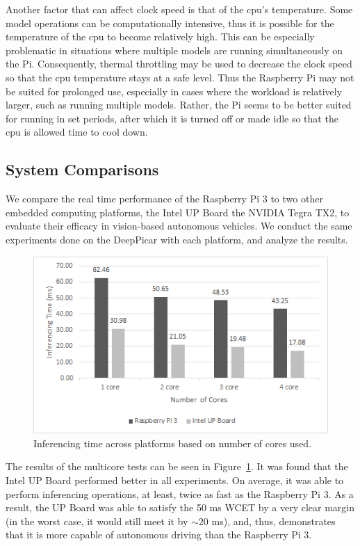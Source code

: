 Another factor that can affect clock speed is that of the cpu's temperature. Some model operations can 
be computationally intensive, thus it is possible for the temperature of the cpu to become relatively 
high. This can be especially problematic in situations where multiple models are running 
simultaneously on the Pi. Consequently, thermal throttling may be used to decrease the clock 
speed so that the cpu temperature stays at a safe level. Thus the Raspberry Pi may not be suited 
for prolonged use, especially in cases where the workload is relatively larger, such as running multiple 
models. Rather, the Pi seems to be better suited for running in set periods, after which it is turned 
off or made idle so that the cpu is allowed time to cool down.

\subsection{System Comparisons}
We compare the real time performance of the Raspberry Pi 3 to two other embedded computing platforms, 
the Intel UP Board the NVIDIA Tegra TX2, to evaluate their efficacy in vision-based autonomous 
vehicles. We conduct the same experiments done on the DeepPicar with each platform, and analyze the 
results.

\begin{figure}[h]
  \centering
  \includegraphics[width=.5\textwidth]{figs/system_multicore}
  \caption{Inferencing time across platforms based on number of cores used.}
  \label{fig:sys_core}
\end{figure}

The results of the multicore tests can be seen in Figure~\ref{fig:sys_core}. It was found that the 
Intel UP Board performed better in all experiments. On average, it was able to perform inferencing 
operations, at least, twice as fast as the Raspberry Pi 3. As a result, the UP Board was able to 
satisfy the 50 ms WCET by a very clear margin (in the worst case, it would still meet it by $\sim$20 
ms), and, thus, demonstrates that it is more capable of autonomous driving than the Raspberry Pi 3.

